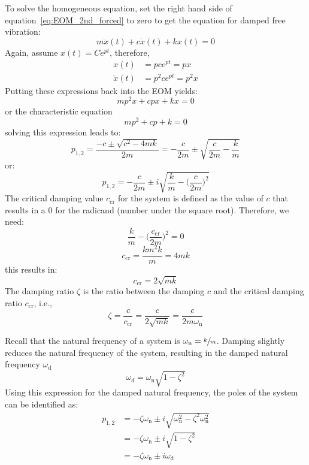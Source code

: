 \documentclass[12pt,letter]{article}
\numberwithin{ex}{section} %
\numberwithin{re}{section} %
\numberwithin{equation}{section}	%
\begin{document}
To solve the homogeneous equation, set the right hand side of equation~\ref{eq:EOM_2nd_forced} to zero to get the equation for damped free vibration:
\begin{equation}
m \ddot{x}(t) + c\dot{x}(t) + kx(t) = 0
\end{equation}
Again, assume $x(t) = Ce^{pt}$, therefore, 
\begin{align}
\dot{x}(t)&= p c e^{ p t}  = px\\
\ddot{x}(t)&= p^2 c e^{ p t} = p^2x \nonumber
\end{align}
Putting these expressions back into the EOM yields:
\begin{equation}
m p^2 x + c p x + k x = 0
\end{equation}
or the characteristic equation
\begin{equation}
mp^2 + c p + k = 0
\end{equation}
solving this expression leads to:
\begin{equation}
p_{1,2} = \frac{-c \pm \sqrt{c^2 -4 m k}}{2 m} = - \frac{c}{2m} \pm \sqrt{\frac{c}{2m} - \frac{k}{m}}
\end{equation}
or:
\begin{equation}
p_{1,2} = - \frac{c}{2m} \pm i \sqrt{\frac{k}{m} - \bigg( \frac{c}{2m}\bigg)^2}
\end{equation}
The critical damping value $c_\text{cr}$ for the system is defined as the value of $c$ that results in a 0 for the radicand (number under the square root). Therefore, we need:
\begin{equation}
\frac{k}{m} - \bigg( \frac{c_\text{cr}}{2m}\bigg)^2 = 0
\end{equation}
\begin{equation}
c_\text{cr} = \frac{k m^2 k}{m} = 4 m k
\end{equation}
this results in:
\begin{equation}
c_\text{cr} = 2  \sqrt{m k}
\end{equation}
The damping ratio $\zeta$ is the ratio between the damping $c$ and the critical damping ratio $c_\text{cr}$, i.e.,
\begin{equation}
\zeta = \frac{c}{c_\text{cr}} = \frac{c}{2 \sqrt{m k}} = \frac{c}{2m\omega_\text{n}}
\end{equation}

Recall that the natural frequency of a system is $\omega_\text{n} = \sfrac{k}{m}$. Damping slightly reduces the natural frequency of the system, resulting in the damped natural frequency $\omega_\text{d}$
\begin{equation}
	\omega_d = \omega_\text{n}\sqrt{1-\zeta^2}
\end{equation} 
Using this expression for the damped natural frequency, the poles of the system can be identified as:
\begin{align}
	p_{1,2} &= - \zeta \omega_\text{n} \pm i  \sqrt{\omega_\text{n}^2 - \zeta^2 \omega_\text{n}^2} \\
&= - \zeta \omega_\text{n} \pm i  \sqrt{1 - \zeta^2} \nonumber \\ \nonumber
&= - \zeta \omega_\text{n} \pm i \omega_\text{d} \nonumber
\end{align}
\end{document}
